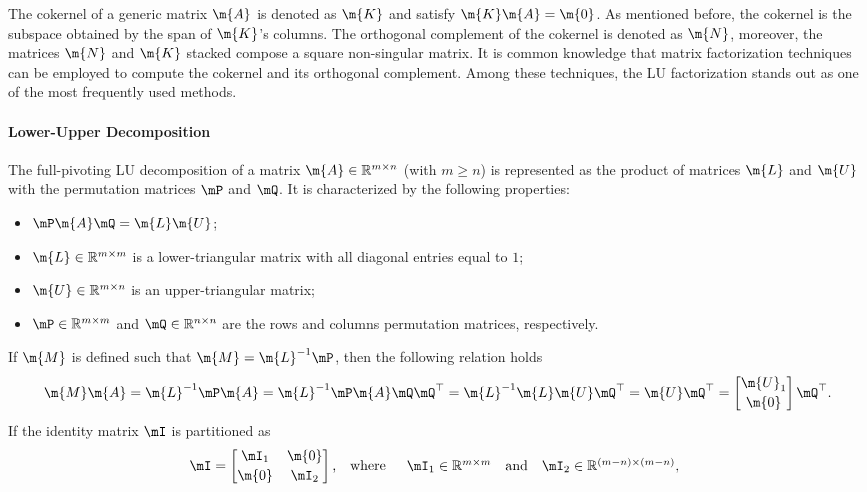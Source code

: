 The cokernel of a generic matrix $\m{A}$ is denoted as $\m{K}$ and satisfy $\m{K}\m{A} = \m{0}$. As mentioned before, the cokernel is the subspace obtained by the span of $\m{K}$'s columns. The orthogonal complement of the cokernel is denoted as $\m{N}$, moreover, the matrices $\m{N}$ and $\m{K}$ stacked compose a square non-singular matrix. It is common knowledge that matrix factorization techniques can be employed to compute the cokernel and its orthogonal complement. Among these techniques, the \ac{LU} factorization stands out as one of the most frequently used methods.

\paragraph{Lower-Upper Decomposition}

The full-pivoting \ac{LU} decomposition of a matrix $\m{A} \in \mathbb{R}^{m \times n}$ (with $m\geq n$) is represented as the product of matrices $\m{L}$ and $\m{U}$ with the permutation matrices $\mP$ and $\mQ$. It is characterized by the following properties:
%
\begin{itemize}
  \setlength{\itemsep}{0.0em}
  \item $\mP\m{A}\mQ = \m{L}\m{U}$;
  \item $\m{L} \in \mathbb{R}^{m \times m}$ is a lower-triangular matrix with all diagonal entries equal to $1$;
  \item $\m{U} \in \mathbb{R}^{m \times n}$ is an upper-triangular matrix;
  \item $\mP \in \mathbb{R}^{m \times m}$ and $\mQ \in \mathbb{R}^{n \times n}$ are the rows and columns permutation matrices, respectively.
\end{itemize}
%
If $\m{M}$ is defined such that $\m{M} = \m{L}^{-1}\mP$, then the following relation holds
%
\begin{equation*}
    \m{M}\m{A}
    = \m{L}^{-1}\mP\m{A}
    = \m{L}^{-1}\mP\m{A}\mQ\mQ^\top
    = \m{L}^{-1}\m{L}\m{U}\mQ^\top
    = \m{U}\mQ^\top
    = \begin{bmatrix} \m{U}_1 \\[0.2em] \m{0} \end{bmatrix}\mQ^\top \text{.}
\end{equation*}
%
If the identity matrix $\mI$ is partitioned as
%
\begin{equation*}
  \mI = \begin{bmatrix}
    \mI_1 & \m{0} \\[0.2em]
    \m{0} & \mI_2
  \end{bmatrix} \text{,}
  \quad \text{where} \quad
  \begin{array}{l}
    \mI_1 \in \mathbb{R}^{m \times m} \quad \text{and} \quad
    \mI_2 \in \mathbb{R}^{(m-n)\times(m-n)}\text{,}
  \end{array}
\end{equation*}
